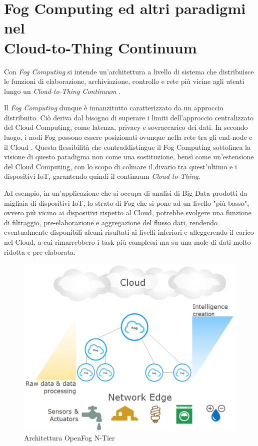 \section[Fog Computing ed Altri Paradigmi nel Cloud-to-Thing Continuum]{Fog Computing ed altri paradigmi nel \\Cloud-to-Thing Continuum}

Con \textit{Fog Computing} si intende un'architettura a livello di sistema che distribuisce le funzioni di elaborazione, archiviazione, controllo e rete più vicine agli utenti lungo un \textit{Cloud-to-Thing Continuum} \cite{OpenFogReferenceArchitecture}.

Il \textit{Fog Computing} dunque è innanzitutto caratterizzato da un approccio distribuito. Ciò deriva dal bisogno di superare i limiti dell'approccio centralizzato del Cloud Computing, come latenza, privacy e sovraccarico dei dati. In secondo luogo, i nodi Fog possono essere posizionati ovunque nella rete tra gli end-node e il Cloud \cite{CloudComputingBigDataIssues}. Questa flessibilità che contraddistingue il Fog Computing sottolinea la visione di questo paradigma non come una sostituzione, bensì come un'estensione del Cloud Computing, con lo scopo di colmare il divario tra quest'ultimo e i dispositivi IoT, garantendo quindi il continuum \textit{Cloud-to-Thing}.

Ad esempio, in un'applicazione che si occupa di analisi di Big Data prodotti da migliaia di dispositivi IoT, lo strato di Fog che si pone ad un livello "più basso", ovvero più vicino ai dispositivi  rispetto al Cloud, potrebbe svolgere una funzione di filtraggio, pre-elaborazione e aggregazione del flusso dati, rendendo eventualmente disponibili alcuni risultati ai livelli inferiori e alleggerendo il carico nel Cloud, a cui rimarrebbero i task più complessi ma su una mole di dati molto ridotta e pre-elaborata.

\begin{figure}[!ht]
  \includegraphics[width=12cm]{images/FogCloudToThingContinuum}
  \centering
  \caption[Architettura OpenFog N-Tier]{Architettura OpenFog N-Tier \cite{OpenFogReferenceArchitecture}}
  \label{fig:ntier_architecture}
\end{figure}

